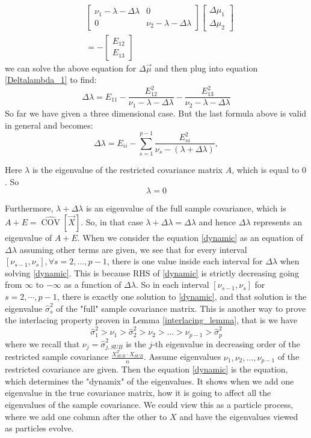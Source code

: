 \documentclass[12pt]{amsart}
\theoremstyle{definition}
\DeclareMathOperator{\Cov}{COV}
\numberwithin{equation}{section}
\numberwithin{equation}{section}
\theoremstyle{remark}
\numberwithin{equation}{section}
\begin{document}
	\begin{align*}
	&\left[\begin{array}{ccccccccc}
	\nu_1-\lambda-\Delta\lambda&0\\
	0&\nu_2-\lambda-\Delta\lambda
	\end{array}
	\right]
	\left[\begin{array}{ccccccccc}
	\Delta\mu_1\\
	\Delta\mu_2
	\end{array}\right]\\
	&=
	-
	\left[
	\begin{array}{ccccccccc}
	E_{12}\\
	E_{13}
	\end{array}
	\right]
	\end{align*}
we can solve the above equation for $\Delta\vec{\mu}$ and then plug into equation \ref{Deltalambda_1} to find:
	$$\Delta\lambda=E_{11}-\frac{E_{12}^2}{\nu_1-\lambda-\Delta\lambda}-
	\frac{E_{13}^2}{\nu_2-\lambda-\Delta\lambda}$$
So far we have given a three dimensional case. But the last formula above is valid in general and becomes:
 \begin{equation}
 \label{dynamic}
 \Delta\lambda=E_{ii}-\sum_{s=1}^{p-1} \frac{E_{si}^2}{\nu_s-(\lambda+\Delta\lambda)},
 \end{equation}

Here $\lambda$ is the eigenvalue of the restricted covariance matrix $A$, which is equal to $0$. So
 $$\lambda=0$$

Furthermore, $\lambda+\Delta\lambda$ is an eigenvalue of the full sample covariance, which is $A+E=\hat{\Cov}[\vec{X}]$. So, in that case $\lambda+\Delta\lambda=\Delta\lambda$ and hence $\Delta\lambda$ represents an eigenvalue of $A+E$. When we consider the equation \ref{dynamic} as an equation of $\Delta\lambda$ assuming other terms are given, we see that for every interval $[\nu_{s-1},\nu_s], \forall s=2,\ldots,{p-1}$, there is one value inside each interval for $\Delta\lambda$ when solving \ref{dynamic}. This is because RHS of \ref{dynamic} is strictly decreasing going from $\infty$ to $-\infty$ as a function of $\Delta\lambda$. So in each interval $[\nu_{s-1},\nu_s]$ for $s=2,\cdots,p-1$, there is exactly one solution to \ref{dynamic}, and that solution is the eigenvalue $\hat{\sigma}_s^2$ of the "full" sample covariance matrix. This is another way to prove the interlacing property proven in Lemma \ref{interlacing_lemma}, that is we have
 		$$\hat{\sigma}^2_1>\nu_1>\hat{\sigma}^2_2>\nu_2>\ldots>\nu_{p-1}>\hat{\sigma}^2_{p}$$
where we recall that $\nu_j=\hat{\sigma}_{j,SUB}^2$ is the $j$-th eigenvalue in decreasing order of
the restricted sample covariance $\frac{X_{SUB}^T\cdot X_{SUB}}{n}$. Assume eigenvalues $\nu_1,\nu_2,\ldots,\nu_{p-1}$ of the restricted covariance are given. Then the equation \ref{dynamic} is the equation, which determines the "dynamix" of the eigenvalues. It shows when we add one eigenvalue in the true covariance matrix, how it is going to affect all the eigenvalues of the sample covariance. We could view this as a particle process, where we add one column after the other to $X$ and have the eigenvalues viewed as particles evolve.
 		
\end{document}
